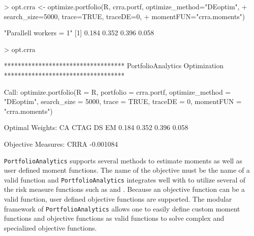 \documentclass[a4paper]{article}
\begin{document}
\begin{Schunk}
\begin{Sinput}
> opt.crra <- optimize.portfolio(R, crra.portf, optimize_method="DEoptim",
+                                  search_size=5000, trace=TRUE, traceDE=0,
+                                  momentFUN="crra.moments")
\end{Sinput}
\begin{Soutput}
[1] "Parallell workers = 1"
[1] 0.184 0.352 0.396 0.058
\end{Soutput}
\begin{Sinput}
> opt.crra
\end{Sinput}
\begin{Soutput}
***********************************
PortfolioAnalytics Optimization
***********************************

Call:
optimize.portfolio(R = R, portfolio = crra.portf, optimize_method = "DEoptim", 
    search_size = 5000, trace = TRUE, traceDE = 0, momentFUN = "crra.moments")

Optimal Weights:
   CA  CTAG    DS    EM 
0.184 0.352 0.396 0.058 

Objective Measures:
     CRRA 
-0.001084 
\end{Soutput}
\end{Schunk}

\verb"PortfolioAnalytics" supports several methods to estimate moments as well as user defined moment functions. The name of the objective must be the name of a valid \R function and \verb"PortfolioAnalytics" integrates well with  to utilize several of the risk measure functions such as  and . Because an objective function can be a valid \R function, user defined objective functions are supported. The modular framework of \verb"PortfolioAnalytics" allows one to easily define custom moment functions and objective functions as valid \R functions to solve complex and specialized objective functions.


\end{document}

